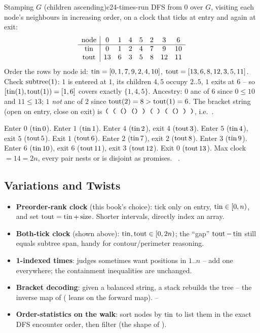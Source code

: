 \begin{example}{Stamping $G$ (children ascending)}{c24-times-run}
DFS from $0$ over $G$, visiting each node's neighbours in increasing order, on a clock that
ticks at entry and again at exit:
\[
  \begin{array}{c|ccccccc}
  \text{node} & 0 & 1 & 4 & 5 & 2 & 3 & 6\\ \hline
  \operatorname{tin} & 0 & 1 & 2 & 4 & 7 & 9 & 10\\
  \operatorname{tout}& 13& 6 & 3 & 5 & 8 & 12& 11
  \end{array}
\]
Order the rows by node id: $\operatorname{tin}=[0,1,7,9,2,4,10]$, $\operatorname{tout}=[13,6,8,12,3,5,11]$. Check
$\operatorname{subtree}(1)$: $1$ is entered at $1$, its children $4,5$ occupy $2..5$, $1$ exits at $6$ --
so $[\operatorname{tin}(1),\operatorname{tout}(1))=[1,6]$ covers exactly $\{1,4,5\}$. Ancestry: $0$ anc of $6$ since
$0\le 10$ and $11 \le 13$; $1$ \emph{not} anc of $2$ since $\operatorname{tout}(2)=8 > \operatorname{tout}(1)=6$. The
bracket string (open on entry, close on exit) is
$\texttt{( ( () () ) ( ) ( () ) )}$, i.e.\ \code{((()())(()())())}.
\end{example}
\begin{tracebox}
Enter $0$ ($\operatorname{tin} 0$). Enter $1$ ($\operatorname{tin} 1$). Enter $4$ ($\operatorname{tin} 2$), exit $4$ ($\operatorname{tout} 3$).
Enter $5$ ($\operatorname{tin} 4$), exit $5$ ($\operatorname{tout} 5$). Exit $1$ ($\operatorname{tout} 6$). Enter $2$ ($\operatorname{tin} 7$), exit
$2$ ($\operatorname{tout} 8$). Enter $3$ ($\operatorname{tin} 9$). Enter $6$ ($\operatorname{tin}{10}$), exit $6$ ($\operatorname{tout}{11}$), exit
$3$ ($\operatorname{tout}{12}$). Exit $0$ ($\operatorname{tout}{13}$). Max clock $=14=2n$, every pair nests or is
disjoint as  promises. \checkmark\ .
\end{tracebox}

\subsection{Variations and Twists}

\begin{itemize}[nosep]
  \item \textbf{Preorder-rank clock} (this book's  choice): tick only on
        entry, $\operatorname{tin}\in[0,n)$, and set $\operatorname{tout}=\operatorname{tin}+\operatorname{size}$. Shorter intervals, directly index
        an array. \hfill{}
  \item \textbf{Both-tick clock} (shown above): $\operatorname{tin},\operatorname{tout}\in[0,2n)$; the ``gap''
        $\operatorname{tout}-\operatorname{tin}$ still equals subtree span, handy for contour/perimeter reasoning. \hfill{}
  \item \textbf{1-indexed times}: judges sometimes want positions in $1..n$ -- add one
        everywhere; the containment inequalities are unchanged. \hfill{}
  \item \textbf{Bracket decoding}: given a balanced string, a stack rebuilds the tree -- the
        inverse map of  ( leans on the forward map). \hfill{}--
  \item \textbf{Order-statistics on the walk}: sort nodes by $\operatorname{tin}$ to list them in the exact
        DFS encounter order, then filter (the shape of ). \hfill{}
\end{itemize}

